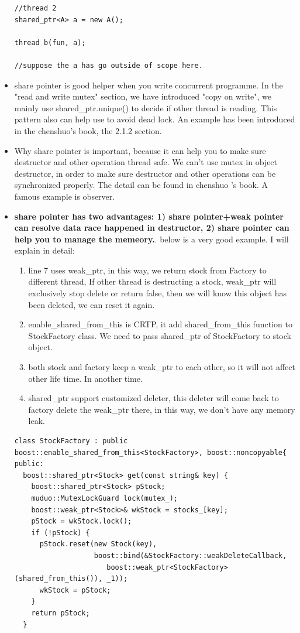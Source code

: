\documentclass[a4paper,11pt,twoside]{book}
\begin{document}
\begin{itemize}
\begin{lstlisting}[]
//thread 2
shared_ptr<A> a = new A();

thread b(fun, a);

//suppose the a has go outside of scope here.
\end{lstlisting}

    \item share pointer is good helper when you write concurrent programme. In the "read and write mutex" section, we have introduced "copy on write", we mainly use shared\_ptr.unique() to decide if other thread is reading. This pattern also can help use to avoid dead lock. An example has been introduced in the chenshuo's book, the 2.1.2 section.

		\item Why share pointer is important, because it can help you to make sure destructor and other operation thread safe. We can't use mutex in object destructor, in order to make sure destructor and other operations can be synchronized properly. The detail can be found in chenshuo 's book. A famous example is observer. 

        \item \textbf{share pointer has two advantages: 1) share pointer+weak pointer can resolve data race happened in destructor, 2) share pointer can help you to manage the memeory.}. below is a very good example.  I will explain in detail:
\begin{enumerate}
    \item line 7 uses weak\_ptr, in this way, we return stock from Factory to different thread, If other thread is destructing a stock,  weak\_ptr will exclusively stop delete or return false, then we will know this object has been deleted, we can reset it again. 
    \item enable\_shared\_from\_this is CRTP, it add shared\_from\_this function to StockFactory class. We need to pass shared\_ptr of StockFactory to stock object. 

    \item both stock and factory keep a weak\_ptr to each other, so it will not affect other life time. In another time. 

    \item shared\_ptr support customized deleter, this deleter will come back to factory delete the weak\_ptr there, in this way, we don't have any memory leak. 
\end{enumerate}

\begin{lstlisting}
class StockFactory : public boost::enable_shared_from_this<StockFactory>, boost::noncopyable{
public:
  boost::shared_ptr<Stock> get(const string& key) {
    boost::shared_ptr<Stock> pStock;
    muduo::MutexLockGuard lock(mutex_);
    boost::weak_ptr<Stock>& wkStock = stocks_[key];
    pStock = wkStock.lock();
    if (!pStock) {
      pStock.reset(new Stock(key),
                   boost::bind(&StockFactory::weakDeleteCallback,
                      boost::weak_ptr<StockFactory>(shared_from_this()), _1));
      wkStock = pStock;
    }
    return pStock;
  }


\end{lstlisting}
\end{itemize}
\end{document}
